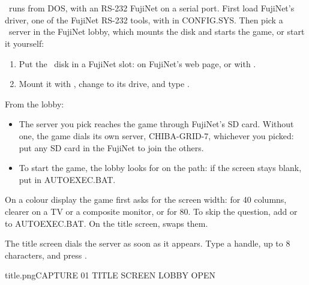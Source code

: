 \documentclass[12pt,letterpaper]{article}
\begin{document}
\chapter{}
\game\ runs from DOS, with an RS-232 FujiNet on a serial port. First load FujiNet's driver, one of
the FujiNet RS-232 tools, with  in CONFIG.SYS. Then pick a \game\ server in the FujiNet lobby,
which mounts the disk and starts the game, or start it yourself:
\begin{enumerate}[nosep]
  \item Put the \game\ disk in a FujiNet slot: on FujiNet's web page, or with .
  \item Mount it with , change to its drive, and type .
\end{enumerate}
From the lobby:
\begin{itemize}[nosep]
  \item The server you pick reaches the game through FujiNet's SD card. Without one, the game dials its own
    server, CHIBA-GRID-7, whichever you picked: put any SD card in the FujiNet to join the others.
  \item To start the game, the lobby looks for  on the path: if the screen stays blank,
    put  in AUTOEXEC.BAT.
\end{itemize}
\begin{sloppypar}
On a colour display the game first asks for the screen width:  for 40 columns, clearer on a TV or a
composite monitor, or  for 80. To skip the question, add  or  to
AUTOEXEC.BAT. On the title screen,  swaps them.
\end{sloppypar}

The title screen dials the server as soon as it appears. Type a handle, up to 8 characters, and press
.

\begin{capture}{title.png}{CAPTURE 01 \quad TITLE SCREEN \quad LOBBY OPEN}
\end{capture}
\end{document}
